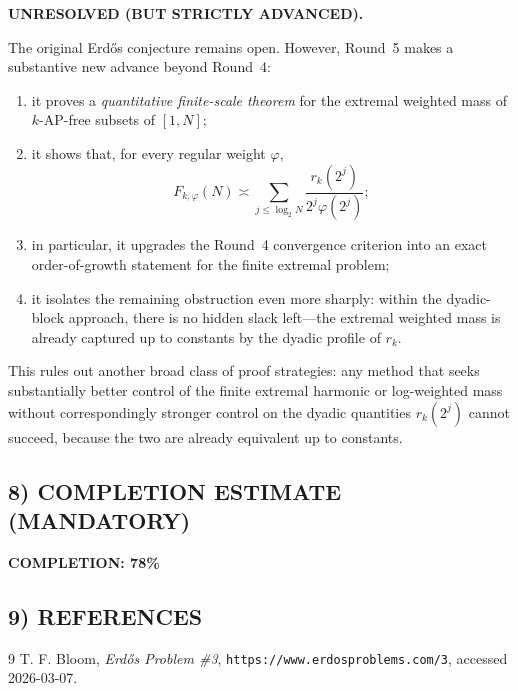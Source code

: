 \textbf{UNRESOLVED (BUT STRICTLY ADVANCED).}

The original Erd\H{o}s conjecture remains open. However, Round~5 makes a substantive new advance beyond Round~4:

\begin{enumerate}
\item it proves a \emph{quantitative finite-scale theorem} for the extremal weighted mass of $k$-AP-free subsets of $[1,N]$;
\item it shows that, for every regular weight $\varphi$,
\[
F_{k,\varphi}(N)
\asymp
\sum_{j\le \log_2 N}\frac{r_k(2^j)}{2^j\varphi(2^j)};
\]
\item in particular, it upgrades the Round~4 convergence criterion into an exact order-of-growth statement for the finite extremal problem;
\item it isolates the remaining obstruction even more sharply: within the dyadic-block approach, there is no hidden slack left---the extremal weighted mass is already captured up to constants by the dyadic profile of $r_k$.
\end{enumerate}

This rules out another broad class of proof strategies: any method that seeks substantially better control of the finite extremal harmonic or log-weighted mass without correspondingly stronger control on the dyadic quantities $r_k(2^j)$ cannot succeed, because the two are already equivalent up to constants.

\subsection{8) COMPLETION ESTIMATE (MANDATORY)}

\noindent\textbf{COMPLETION: 78\%}

\subsection{9) REFERENCES}

\begin{thebibliography}{9}
T. F. Bloom, \emph{Erd\H{o}s Problem \#3}, \texttt{https://www.erdosproblems.com/3}, accessed 2026-03-07.
\end{thebibliography}
